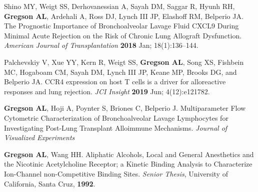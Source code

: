 \documentclass[letterpaper,10pt,sans,dvipsnames,final]{moderncv}%
\begin{document}
\begin{thebibliography}{1}
 \bibitem[40]{} Shino MY, Weigt SS, Derhovanessian A, Sayah DM, Saggar R, Hyunh RH, \textbf{Gregson AL}, Ardehali A, Ross DJ, Lynch III JP, Elashoff RM, Belperio JA. The Prognostic Importance of Bronchoalveolar Lavage Fluid CXCL9 During Minimal Acute Rejection on the Risk of Chronic Lung Allograft Dysfunction. {\color{BrickRed}\textit{American Journal of Transplantation}} \textbf{2018} Jan; 18(1):136--144. \href{https://doi.org/10.1111/ajt.14397}{\aiDoi}

  \bibitem[41]{} Palchevskiy V, Xue YY, Kern R, Weigt SS, \textbf{Gregson AL}, Song XS, Fishbein MC, Hogaboam CM, Sayah DM, Lynch III JP, Keane MP, Brooks DG, and Belperio JA. CCR4 expression on host T cells is a driver for alloreactive responses and lung rejection. {\color{BrickRed}\textit{JCI Insight}} \textbf{2019} Jun; 4(12):e121782. \href{https://doi.org/10.1172/jci.insight.121782}{\aiDoi}

\end{thebibliography}




\vspace{0.2cm}
\renewcommand{\refname}{Publications---Research Papers---Peer Reviewed ({\smaller Submitted})}
\begin{thebibliography}{1}
  \bibitem[1]{} \textbf{Gregson AL}, Hoji A, Poynter S, Briones C, Belperio J. Multiparameter Flow Cytometric Characterization of Bronchoalveolar Lavage Lymphocytes for Investigating Post-Lung Transplant Alloimmune Mechanisms. {\color{BrickRed}\textit{Journal of Visualized Experiments}}

\end{thebibliography}

\vspace{0.2cm}
\renewcommand{\refname}{Publications---Research Papers---non-Peer Reviewed}
\begin{thebibliography}{1}
 \bibitem[1]{} \textbf{Gregson AL}, Wang HH. Aliphatic Alcohols, Local and General Anesthetics and the Nicotinic Acetylcholine Receptor; a Kinetic Binding Analysis to Characterize Ion-Channel non-Competitive Binding Sites. \textit{Senior Thesis}, University of California, Santa Cruz, \textbf{1992}.
\end{thebibliography}
\end{document}
